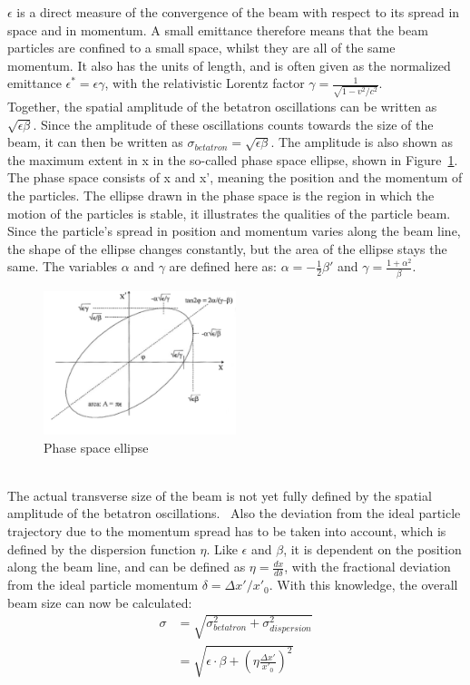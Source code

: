 $\epsilon$ is a direct measure of the convergence of the beam with respect to its spread in space and in momentum.
A small emittance therefore means that the beam particles are confined to a small space, whilst they are all of the same momentum.
It also has the units of length, and is often given as the normalized emittance $\epsilon^* = \epsilon\gamma$, with the relativistic Lorentz factor $\gamma=\frac{1}{\sqrt{1-v^2/c^2}}$.\\
Together, the spatial amplitude of the betatron oscillations can be written as $\sqrt{\epsilon\beta}$.
Since the amplitude of these oscillations counts towards the size of the beam, it can then be written as $\sigma_{betatron} = \sqrt{\epsilon\beta}$.
The amplitude is also shown as the maximum extent in x in the so-called phase space ellipse, shown in Figure~\ref{fig:PhaseSpaceEllipse}.
The phase space consists of x and x', meaning the position and the momentum of the particles.
The ellipse drawn in the phase space is the region in which the motion of the particles is stable, it illustrates the qualities of the particle beam.
Since the particle's spread in position and momentum varies along the beam line, the shape of the ellipse changes constantly, but the area of the ellipse stays the same.
The variables $\alpha$ and $\gamma$ are defined here as: $\alpha = -\frac12\beta'$ and $\gamma = \frac{1+\alpha^2}{\beta}$.~\cite[cf. p. 283ff]{Wangler}
\begin{figure}[h]
\centering
\includegraphics[width=0.5\textwidth]{Figures/PhaseSpaceEllipse_w_AxisTitles.png}
\caption[Phase space ellipse]{Phase space ellipse~\cite[cf. p. 158]{Wiedemann}}
\label{fig:PhaseSpaceEllipse}
\end{figure}
\\The actual transverse size of the beam is not yet fully defined by the spatial amplitude of the betatron oscillations.~\cite[cf. p. 108ff]{Conte}
Also the deviation from the ideal particle trajectory due to the momentum spread has to be taken into account, which is defined by the dispersion function $\eta$.
Like $\epsilon$ and $\beta$, it is dependent on the position along the beam line, and can be defined as $\eta = \frac{dx}{d\delta}$, with the fractional deviation from the ideal particle momentum $\delta = \Delta x'/x'_0$.
With this knowledge, the overall beam size can now be calculated:
\begin{align}
 \sigma&=\sqrt{\sigma^2_{betatron}+\sigma^2_{dispersion}}\\
 &=\sqrt{\epsilon\cdot\beta+\left(\eta\frac{\Delta x'}{x'_0}\right)^2}
\end{align}

